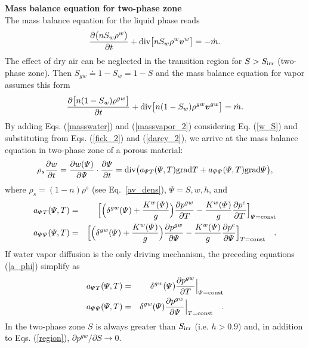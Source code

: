 {\bf Mass balance equation for two-phase zone}\\

The mass balance equation for the liquid phase reads 
\begin{eqnarray}\label{masswater}
\frac{\partial \big( n S_w \rho^w\big)}{\partial t} + {\rm div} \big[n S_w \rho^w \mbox{\boldmath$v$}^w\big]
 = -\dot{m}.
\end{eqnarray}
The effect of dry air can be neglected in the transition region for $S > S_{\rm irr}$ (two-phase zone). 
Then $S_{gw} \doteq 1-S_{w} = 1-S$ and the mass balance equation for vapor assumes this form
\begin{eqnarray}\label{massvapor_2}
\frac{\partial \big[n(1- S_w) \rho^{gw}\big]}{\partial t} + {\rm div} \big[n (1-S_w)
\rho^{gw} \mbox{\boldmath$v$}^{gw}\big] = \dot{m}.
\end{eqnarray}
By adding Eqs. (\ref{masswater}) and (\ref{massvapor_2}) considering Eq. (\ref{w_S}) and substituting from 
Eqs. (\ref{fick_2}) and (\ref{darcy_2}), 
we arrive at the mass balance equation in two-phase zone of a porous material:
\begin{eqnarray}\label{twophase}
\rho_s \frac{\partial w}{\partial t} = \frac{\partial w(\varPsi)}{\partial \varPsi} 
\cdot \frac{\partial \varPsi}{\partial t} = 
{\rm div} \big( a_{\varPsi T}(\varPsi, T) {\rm grad} T + a_{\varPsi \varPsi}(\varPsi, T){\rm grad} \varPsi \big),
\end{eqnarray}
where $\rho_s = (1 - n)\rho^s$ (see Eq.~\eqref{av_dens}), $\varPsi = S, w, h$, and
\begin{eqnarray}\label{a_phi}
a_{\varPsi T}(\varPsi, T) &=& \Big[\Big( \delta^{gw}(\varPsi) + \frac{K^w(\varPsi)}{g} \Big) 
\frac{\partial p^{gw}}{\partial T} - \frac{K^w(\varPsi)}{g} \frac{\partial p^{c}}{\partial T} \Big]_{\varPsi = 
{\rm const}}\nonumber\\
a_{\varPsi \varPsi}(\varPsi, T) &=& \Big[\Big( \delta^{gw}(\varPsi) + \frac{K^w(\varPsi)}{g} \Big) 
\frac{\partial p^{gw}}{\partial \varPsi} - \frac{K^w(\varPsi)}{g} \frac{\partial p^{c}}{\partial \varPsi} \Big]_{T = 
{\rm const}}\quad .
\end{eqnarray}
If water vapor diffusion is the only driving mechanism, the preceding equations (\ref{a_phi}) simplify as
\begin{eqnarray}
a_{\varPsi T}(\varPsi, T) &=& \delta^{gw}(\varPsi) \frac{\partial p^{gw}}{\partial T}\Big|_{\varPsi = 
{\rm const}}\nonumber\\
a_{\varPsi \varPsi}(\varPsi, T) &=& \delta^{gw}(\varPsi) \frac{\partial p^{gw}}{\partial \varPsi} \Big|_{T = 
{\rm const}}\quad .
\end{eqnarray}
In the two-phase zone $S$ is always greater than $S_{\rm irr}$ (i.e. $h > 0.9$) and, in addition to Eqs. (\ref{region}), 
$\partial p^{gw}/\partial S \rightarrow 0$.\\

